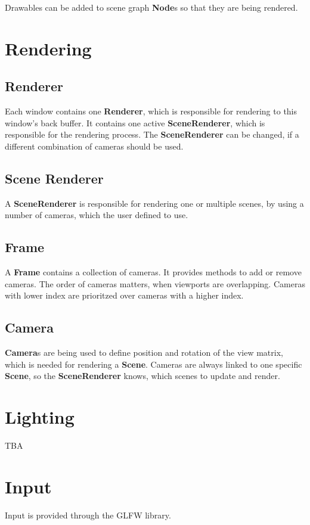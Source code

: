 \documentclass[12p, paper=a4, leqno, colorinlistoftodos]{article}
\begin{document}
			Drawables can be added to scene graph \textbf{Node}s so that they are being rendered.
		
	\pagebreak
	\section{Rendering}
		\subsection{Renderer}
			Each window contains one \textbf{Renderer}, which is responsible for rendering to this window's back buffer. It contains one active \textbf{SceneRenderer}, which is responsible for the rendering process. The \textbf{SceneRenderer} can be changed, if a different combination of cameras should be used.
			
		\subsection{Scene Renderer}
			A \textbf{SceneRenderer} is responsible for rendering one or multiple scenes, by using a number of cameras, which the user defined to use. 
		
		\subsection{Frame}
			A \textbf{Frame} contains a collection of cameras. It provides methods to add or remove cameras. The order of cameras matters, when viewports are overlapping. Cameras with lower index are prioritzed over cameras with a higher index.
		
		\subsection{Camera}
			\textbf{Camera}s are being used to define position and rotation of the view matrix, which is needed for rendering a \textbf{Scene}. Cameras are always linked to one specific \textbf{Scene}, so the \textbf{SceneRenderer} knows, which scenes to update and render.
		
	
	\pagebreak
	\section{Lighting}
		TBA
		
		
		
	\pagebreak
	\section{Input}
	Input is provided through the GLFW library.
		
\end{document}
